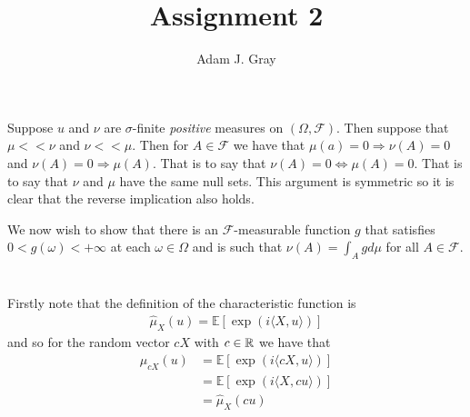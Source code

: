 \documentclass{unswmaths}
\begin{document}
\author{Adam J. Gray}
\title{Assignment 2}
\subject{Measure Theory}

\newcommand{\llra}{\Leftrightarrow}

\unswtitle

\section{}
\section{}
\subsection{}
Suppose $ u $ and $ \nu $ are $\sigma$-finite \emph{positive} measures on $ (\Omega, \mathcal{F}) $. Then suppose that $ \mu << \nu $ and $ \nu << \mu $.
Then for $ A \in \mathcal{F} $ we have that $ \mu(a) = 0 \Rightarrow \nu(A) = 0 $ and $ \nu(A) = 0 \Rightarrow \mu(A) $. That is to say that $ \nu(A) =0 \Leftrightarrow \mu(A) = 0 $. That is to say that $ \nu $ and $ \mu $ have the same null sets. This argument is symmetric so it is clear that the reverse implication also holds.

We now wish to show that there is an $ \mathcal{F}$-measurable function $ g $ that satisfies $ 0 < g(\omega) < +\infty $ at each $ \omega \in \Omega $ and is such that $ \nu(A) = \int_Agd\mu $ for all $ A \in \mathcal{F} $.

\section{}
\subsection{}
Firstly note that the definition of the characteristic function is
\begin{align}
	\hat{\mu}_X(u) = \mathbb{E}[\exp(i\langle X, u \rangle)]
\end{align}
and so for the random vector $ cX $ with $ c \in \mathbb{R} $ we have that
\begin{align}
	\hat{\mu}_{cX}(u) &= \mathbb{E}[ \exp(i \langle cX, u \rangle) ] \\
		 &= \mathbb{E}[ \exp(i \langle X, cu \rangle) ] \\
		 &= \hat{\mu}_{X}(cu)
\end{align}
\subsection{}
\end{document}

